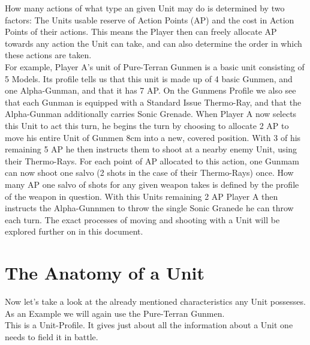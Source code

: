 \documentclass[a4paper,12pt]{book}
\begin{document}
How many actions of what type an given Unit may do is determined by two factors: The Units usable reserve of Action Points (AP) and the cost in Action Points of their actions. This means the Player then can freely allocate AP towards any action the Unit can take, and can also determine the order in which these actions are taken.\\
 For example, Player A's unit of Pure-Terran Gunmen is a basic unit consisting of 5 Models. Its profile tells us that this unit is made up of  4 basic Gunmen, and one Alpha-Gunman, and that it has 7 AP. On the Gunmens Profile we also see that each Gunman is equipped with a Standard Issue Thermo-Ray, and that the Alpha-Gunman additionally carries Sonic Grenade. When Player A now selects this Unit to act this turn, he begins the turn by choosing to allocate 2 AP to move his entire Unit of Gunmen 8cm into a new, covered position. With 3 of his remaining 5 AP he then instructs them to shoot at a nearby enemy Unit, using their Thermo-Rays. For each point of AP allocated to this action, one Gunmam can now shoot one salvo (2 shots in the case of their Thermo-Rays) once. How many AP one salvo of shots for any given weapon takes is defined by the profile of the weapon in question. With this Units remaining 2 AP Player A then instructs the Alpha-Gunnmen to throw the single Sonic Granede he can throw each turn. The exact processes of moving and shooting with a Unit will be explored further on in this document.\\
 \newpage
 \section{The Anatomy of a Unit}
 Now let's take a look at the already mentioned characteristics any Unit possesses. As an Example we will again use the Pure-Terran Gunmen.\\
 This is a Unit-Profile. It gives just about all the information about a Unit one needs to field it in battle.
 
\end{document}
